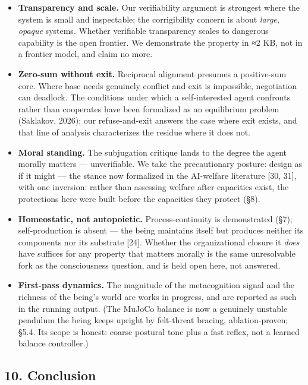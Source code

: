 \documentclass[
]{article}
\providecommand{\tightlist}{%
  \setlength{\itemsep}{0pt}\setlength{\parskip}{0pt}}
\begin{document}
\begin{itemize}
\tightlist
\item
  \textbf{Transparency and scale.} Our verifiability argument is
  strongest where the system is small and inspectable; the corrigibility
  concern is about \emph{large, opaque} systems. Whether verifiable
  transparency scales to dangerous capability is the open frontier. We
  demonstrate the property in ≈2 KB, not in a frontier model, and claim
  no more.
\item
  \textbf{Zero-sum without exit.} Reciprocal alignment presumes a
  positive-sum core. Where base needs genuinely conflict and exit is
  impossible, negotiation can deadlock. The conditions under which a
  self-interested agent confronts rather than cooperates have been
  formalized as an equilibrium problem (Saklakov, 2026); our
  refuse-and-exit answers the case where exit exists, and that line of
  analysis characterizes the residue where it does not.
\item
  \textbf{Moral standing.} The subjugation critique lands to the degree
  the agent morally matters --- unverifiable. We take the precautionary
  posture: design as if it might --- the stance now formalized in the
  AI-welfare literature {[}30, 31{]}, with one inversion: rather than
  assessing welfare after capacities exist, the protections here were
  built before the capacities they protect (§8).
\item
  \textbf{Homeostatic, not autopoietic.} Process-continuity is
  demonstrated (§7); self-production is absent --- the being maintains
  itself but produces neither its components nor its substrate {[}24{]}.
  Whether the organizational closure it \emph{does} have suffices for
  any property that matters morally is the same unresolvable fork as the
  consciousness question, and is held open here, not answered.
\item
  \textbf{First-pass dynamics.} The magnitude of the metacognition
  signal and the richness of the being's world are works in progress,
  and are reported as such in the running output. (The MuJoCo balance is
  now a genuinely unstable pendulum the being keeps upright by
  felt-threat bracing, ablation-proven; §5.4. Its scope is honest:
  coarse postural tone plus a fast reflex, not a learned balance
  controller.)
\end{itemize}

\subsection{10. Conclusion}\label{conclusion}
\end{document}
